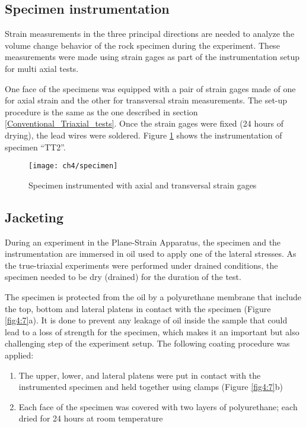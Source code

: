 \subsection{Specimen instrumentation}

Strain measurements in the three principal directions are needed to analyze the volume change behavior of the rock specimen during the experiment. These measurements were made using strain gages as part of the instrumentation setup for multi axial tests. 

One face of the specimens was equipped with a pair of strain gages made of one for axial strain and the other for transversal strain measurements. The set-up procedure is the same as the one described in section \ref{Conventional_Triaxial_tests}. Once the strain gages were fixed (24 hours of drying), the lead wires were soldered. Figure \ref{fig4:6} shows the instrumentation of specimen “TT2”.  

\begin{figure}[tb]
    \centering
    \texttt{[image: ch4/specimen]}
    \caption{Specimen instrumented with axial and transversal strain gages}
    \label{fig4:6}
\end{figure} 

\subsection{Jacketing}

During an experiment in the Plane-Strain Apparatus, the specimen and the instrumentation are immersed in oil used to apply one of the lateral stresses. As the true-triaxial experiments were performed under drained conditions, the specimen needed to be dry (drained) for the duration of the test. 

The specimen is protected from the oil by a polyurethane membrane that include the top, bottom and lateral platens in contact with the specimen (Figure \ref{fig4:7}a). It is done to prevent any leakage of oil inside the sample that could lead to a loss of strength for the specimen, which makes it an important but also challenging step of the experiment setup. The following coating procedure was applied: 

\begin{enumerate}
    \item The upper, lower, and lateral platens were put in contact with the instrumented specimen and held together using clamps (Figure \ref{fig4:7}b)
    \item Each face of the specimen was covered with two layers of polyurethane; each dried for 24 hours at room temperature
\end{enumerate}

